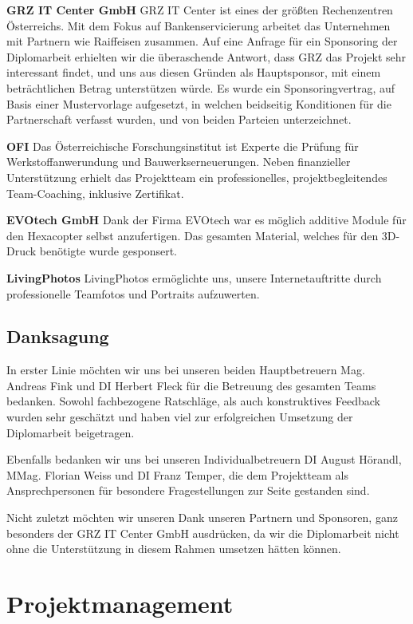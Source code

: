 \textbf{GRZ IT Center GmbH}
{GRZ IT Center\cite{grz}} ist eines der größten Rechenzentren Österreichs. Mit dem Fokus auf Bankenservicierung arbeitet das Unternehmen
mit Partnern wie Raiffeisen zusammen. Auf eine Anfrage für ein Sponsoring der Diplomarbeit erhielten wir die überaschende
Antwort, dass GRZ das Projekt sehr interessant findet, und uns aus diesen Gründen als Hauptsponsor, mit einem beträchtlichen Betrag
unterstützen würde.
Es wurde ein Sponsoringvertrag, auf Basis einer Mustervorlage aufgesetzt, in welchen beidseitig Konditionen für die Partnerschaft
verfasst wurden, und von beiden Parteien unterzeichnet.

\textbf{OFI}
{Das Österreichische Forschungsinstitut\cite{ofi}} ist Experte die Prüfung für Werkstoffanwerundung
und Bauwerkserneuerungen. Neben finanzieller Unterstützung erhielt das Projektteam
ein professionelles, projektbegleitendes Team-Coaching, inklusive Zertifikat.

\textbf{EVOtech GmbH}
Dank der Firma {EVOtech\cite{evotech}} war es möglich additive Module für den Hexacopter selbst anzufertigen.
Das gesamten Material, welches für den 3D-Druck benötigte wurde gesponsert.

\textbf{LivingPhotos}
LivingPhotos ermöglichte uns, unsere Internetauftritte durch professionelle Teamfotos und Portraits aufzuwerten.

\section{Danksagung}
In erster Linie möchten wir uns bei unseren beiden Hauptbetreuern Mag. Andreas Fink und DI Herbert Fleck für die
Betreuung des gesamten Teams bedanken. Sowohl fachbezogene Ratschläge, als auch konstruktives Feedback wurden sehr
geschätzt und haben viel zur erfolgreichen Umsetzung der Diplomarbeit beigetragen.

Ebenfalls bedanken wir uns bei unseren Individualbetreuern DI August Hörandl, MMag. Florian Weiss und
DI Franz Temper, die dem Projektteam als Ansprechpersonen für besondere Fragestellungen zur Seite gestanden
sind.

Nicht zuletzt möchten wir unseren Dank unseren Partnern und Sponsoren, ganz besonders der GRZ IT Center GmbH
ausdrücken, da wir die Diplomarbeit nicht ohne die Unterstützung in diesem Rahmen umsetzen hätten können.

\chapter{Projektmanagement}
\renewcommand{\kapitelautor}{Autor: Markus Kaiser}

